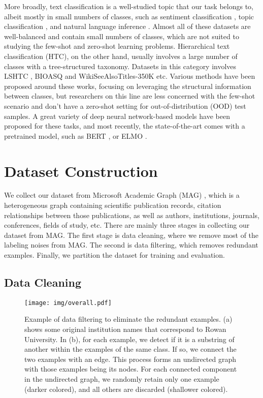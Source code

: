\documentclass{article}
\begin{document}
More broadly, text classification is a well-studied topic that our task belongs to, albeit mostly in small numbers of classes, such as sentiment classification  \cite{maas-EtAl:2011:ACL-HLT2011}, topic classification  \cite{journals/semweb/LehmannIJJKMHMK15}, and natural language inference  \cite{marelli2014semeval}. Almost all of these datasets are well-balanced and contain small numbers of classes, which are not suited to studying the few-shot and zero-shot learning problems. Hierarchical text classification (HTC), on the other hand, usually involves a large number of classes with a tree-structured taxonomy. Datasets in this category involves LSHTC \cite{partalas2015lshtc}, BIOASQ \cite{tsatsaronis2015overview} and WikiSeeAlsoTitles-350K \cite{kharbanda2021embedding} etc. Various methods have been proposed around these works, focusing on leveraging the structural information between classes, but researchers on this line are less concerned with the few-shot scenario and don't have a zero-shot setting for out-of-distribution (OOD) test samples. 
A great variety of deep neural network-based models have been proposed for these tasks, and most recently, the state-of-the-art comes with a pretrained model, such as BERT  \cite{DBLP:conf/naacl/DevlinCLT19}, or ELMO  \cite{peters2018deep}. 


\section{Dataset Construction}

We collect our dataset from Microsoft Academic Graph (MAG) \cite{sinha2015overview}, which is a heterogeneous graph containing scientific publication records, citation relationships between those publications, as well as authors, institutions, journals, conferences, fields of study, etc. There are mainly three stages in collecting our dataset from MAG. The first stage is data cleaning, where we remove most of the labeling noises from MAG. The second is data filtering, which removes redundant examples. Finally, we partition the dataset for training and evaluation.

\subsection{Data Cleaning}
\label{dataset_clean}

\begin{figure*}
    \centering
    \texttt{[image: img/overall.pdf]}
    \caption{Example of data filtering to eliminate the redundant examples. (a) shows some original institution names that correspond to Rowan University. In (b), for each example, we detect if it is a substring of another within the examples of the same class. If so, we connect the two examples with an edge. This process forms an undirected graph with those examples being its nodes. For each connected component in the undirected graph, we randomly retain only one example (darker colored), and all others are discarded (shallower colored). }
    \label{fig:connected}
\end{figure*}
\end{document}
